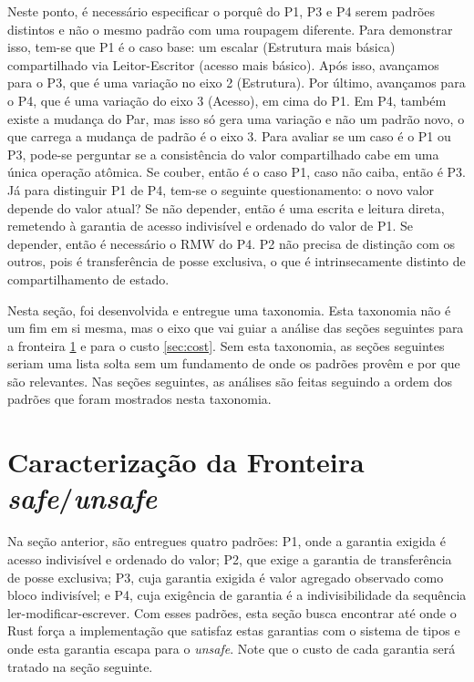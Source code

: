 Neste ponto, é necessário especificar o porquê do P1, P3 e P4 serem padrões distintos e não o mesmo padrão com uma roupagem diferente. Para demonstrar isso, tem-se que P1 é o caso base: um escalar (Estrutura mais básica) compartilhado via Leitor-Escritor (acesso mais básico). Após isso, avançamos para o P3, que é uma variação no eixo 2 (Estrutura). Por último, avançamos para o P4, que é uma variação do eixo 3 (Acesso), em cima do P1. Em P4, também existe a mudança do Par, mas isso só gera uma variação e não um padrão novo, o que carrega a mudança de padrão é o eixo 3. Para avaliar se um caso é o P1 ou P3, pode-se perguntar se a consistência do valor compartilhado cabe em uma única operação atômica. Se couber, então é o caso P1, caso não caiba, então é P3. Já para distinguir P1 de P4, tem-se o seguinte questionamento: o novo valor depende do valor atual? Se não depender, então é uma escrita e leitura direta, remetendo à garantia de acesso indivisível e ordenado do valor de P1. Se depender, então é necessário o \ac{RMW} do P4. P2 não precisa de distinção com os outros, pois é transferência de posse exclusiva, o que é intrinsecamente distinto de compartilhamento de estado.

Nesta seção, foi desenvolvida e entregue uma taxonomia. Esta taxonomia não é um fim em si mesma, mas o eixo que vai guiar a análise das seções seguintes para a fronteira \ref{sec:border} e para o custo \ref{sec:cost}. Sem esta taxonomia, as seções seguintes seriam uma lista solta sem um fundamento de onde os padrões provêm e por que são relevantes. Nas seções seguintes, as análises são feitas seguindo a ordem dos padrões que foram mostrados nesta taxonomia.

\section{Caracterização da Fronteira \textit{safe}/\textit{unsafe}}
\label{sec:border}

Na seção anterior, são entregues quatro padrões: P1, onde a garantia exigida é acesso indivisível e ordenado do valor; P2, que exige a garantia de transferência de posse exclusiva; P3, cuja garantia exigida é valor agregado observado como bloco indivisível; e P4, cuja exigência de garantia é a indivisibilidade da sequência ler-modificar-escrever. Com esses padrões, esta seção busca encontrar até onde o Rust força a implementação que satisfaz estas garantias com o sistema de tipos e onde esta garantia escapa para o \textit{unsafe}. Note que o custo de cada garantia será tratado na seção seguinte.

